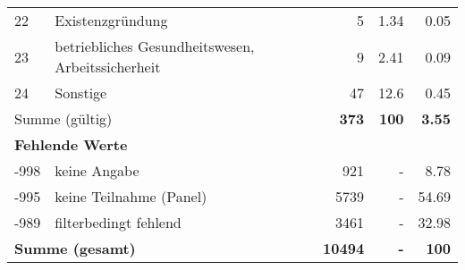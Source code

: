 \begin{longtable}{lXrrr}
        22 & \multicolumn{1}{X}{Existenzgründung} & %
          \num{5} &
          \num[round-mode=places,round-precision=2]{1.34} &
          \num[round-mode=places,round-precision=2]{0.05} \\

        23 & \multicolumn{1}{X}{betriebliches Gesundheitswesen, Arbeitssicherheit} & %
          \num{9} &
          \num[round-mode=places,round-precision=2]{2.41} &
          \num[round-mode=places,round-precision=2]{0.09} \\

        24 & \multicolumn{1}{X}{Sonstige} & %
          \num{47} &
          \num[round-mode=places,round-precision=2]{12.6} &
          \num[round-mode=places,round-precision=2]{0.45} \\

     \midrule
     \multicolumn{2}{l}{Summe (gültig)} &
       \textbf{\num{373}} &
     \textbf{\num{100}} &
       \textbf{\num[round-mode=places,round-precision=2]{3.55}} \\
     \multicolumn{5}{l}{\textbf{Fehlende Werte}}\\
       -998 &
       keine Angabe &
         \num{921} &
        - &
         \num[round-mode=places,round-precision=2]{8.78} \\
       -995 &
       keine Teilnahme (Panel) &
         \num{5739} &
        - &
         \num[round-mode=places,round-precision=2]{54.69} \\
       -989 &
       filterbedingt fehlend &
         \num{3461} &
        - &
         \num[round-mode=places,round-precision=2]{32.98} \\
     \midrule
     \multicolumn{2}{l}{\textbf{Summe (gesamt)}} &
          \textbf{\num{10494}} &
        \textbf{-} &
        \textbf{\num{100}} \\
     \bottomrule
     \end{longtable}
     
